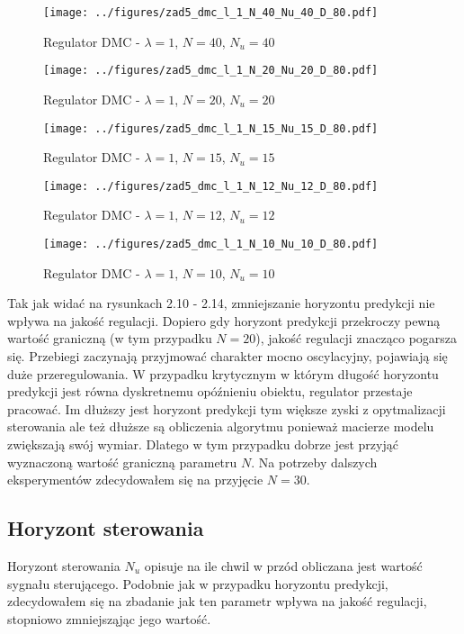 \documentclass[a4paper,titlepage,11pt,floatssmall]{mwrep}
\begin{document}
\begin{figure}[H]
\centering
\texttt{[image: ../figures/zad5\_dmc\_l\_1\_N\_40\_Nu\_40\_D\_80.pdf]}
\caption{Regulator DMC - $\lambda = 1$, $N = 40$, $N_{u} = 40$}
\end{figure}

\begin{figure}[H]
\centering
\texttt{[image: ../figures/zad5\_dmc\_l\_1\_N\_20\_Nu\_20\_D\_80.pdf]}
\caption{Regulator DMC - $\lambda = 1$, $N = 20$, $N_{u} = 20$}
\end{figure}

\begin{figure}[H]
\centering
\texttt{[image: ../figures/zad5\_dmc\_l\_1\_N\_15\_Nu\_15\_D\_80.pdf]}
\caption{Regulator DMC - $\lambda = 1$, $N = 15$, $N_{u} = 15$}
\end{figure}

\begin{figure}[H]
\centering
\texttt{[image: ../figures/zad5\_dmc\_l\_1\_N\_12\_Nu\_12\_D\_80.pdf]}
\caption{Regulator DMC - $\lambda = 1$, $N = 12$, $N_{u} = 12$}
\end{figure}

\begin{figure}[H]
\centering
\texttt{[image: ../figures/zad5\_dmc\_l\_1\_N\_10\_Nu\_10\_D\_80.pdf]}
\caption{Regulator DMC - $\lambda = 1$, $N = 10$, $N_{u} = 10$}
\end{figure}

Tak jak widać na rysunkach 2.10 - 2.14, zmniejszanie horyzontu predykcji nie wpływa na jakość regulacji. Dopiero gdy horyzont predykcji przekroczy pewną wartość graniczną (w tym przypadku $N = 20$), jakość regulacji znacząco pogarsza się. Przebiegi zaczynają przyjmować charakter mocno oscylacyjny, pojawiają się duże przeregulowania. W przypadku krytycznym w którym długość horyzontu predykcji jest równa dyskretnemu opóźnieniu obiektu, regulator przestaje pracować. Im dłuższy jest horyzont predykcji tym większe zyski z opytmalizacji sterowania ale też dłuższe są obliczenia algorytmu ponieważ macierze modelu zwiększają swój wymiar. Dlatego w tym przypadku dobrze jest przyjąć wyznaczoną wartość graniczną parametru $N$. Na potrzeby dalszych eksperymentów zdecydowałem się na przyjęcie $N = 30$. 

\subsection{Horyzont sterowania}
Horyzont sterowania $N_u$ opisuje na ile chwil w przód obliczana jest wartość sygnału sterującego. Podobnie jak w przypadku horyzontu predykcji, zdecydowałem się na zbadanie jak ten parametr wpływa na jakość regulacji, stopniowo zmniejsząjąc jego wartość. 
\end{document}
